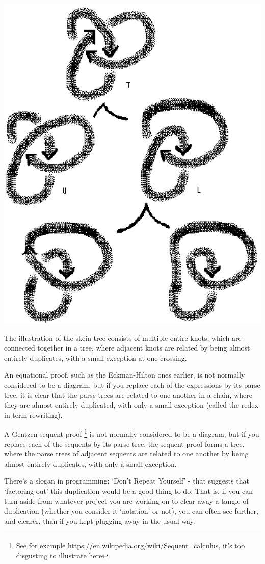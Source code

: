 \documentclass[a4paper]{article}
\begin{document}
\includegraphics[scale=0.25]{images/The-Trefoil-Skein-Tree}

The illustration of the skein tree consists of multiple entire knots, which are connected together in a tree, where adjacent knots are related by being almost entirely duplicates, with a small exception at one crossing.

An equational proof, such as the Eckman-Hilton ones earlier, is not normally considered to be a diagram, but if you replace each of the expressions by its parse tree,
it is clear that the parse trees are related to one another in a chain, where they are almost entirely duplicated, with only a small exception (called the redex in term rewriting).

A Gentzen sequent proof \footnote{See for example \url{https://en.wikipedia.org/wiki/Sequent_calculus}, it's too disgusting to illustrate here} is not normally considered to be a diagram, but if you replace each of the sequents by its parse tree, the sequent proof forms a tree, where the parse trees of adjacent sequents are related to one another by being almost entirely duplicates, with only a small exception.

There's a slogan in programming: `Don't Repeat Yourself' - that suggests that `factoring out' this duplication would be a good thing to do.
That is, if you can turn aside from whatever project you
are working on to clear away a tangle of duplication (whether
you consider it `notation' or not), you can often see further,
and clearer, than if you kept plugging away in the usual way.





\end{document}

